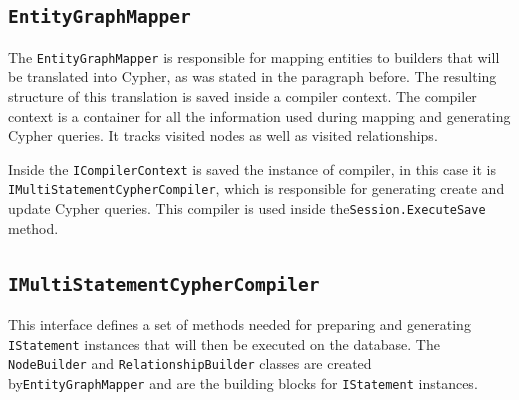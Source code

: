 \subsection{\texttt{EntityGraphMapper}}

The \texttt{EntityGraphMapper} is responsible for mapping entities to builders that will be translated into Cypher, as was stated in the paragraph before.
The resulting structure of this translation is saved inside a compiler context.
The compiler context is a container for all the information used during mapping and generating Cypher queries.
It tracks visited nodes as well as visited relationships.

Inside the \texttt{ICompilerContext} is saved the instance of compiler, in this case it is \texttt{IMultiStatementCypherCompiler}, which is responsible for generating create and update Cypher queries.
This compiler is used inside the\linebreak\texttt{Session.ExecuteSave} method.

\subsection{\texttt{IMultiStatementCypherCompiler}}


This interface defines a set of methods needed for preparing and generating \texttt{IStatement} instances that will then be executed on the database.
The \texttt{NodeBuilder} and \texttt{RelationshipBuilder} classes are created by\linebreak\texttt{EntityGraphMapper} and are the building blocks for \texttt{IStatement} instances.

